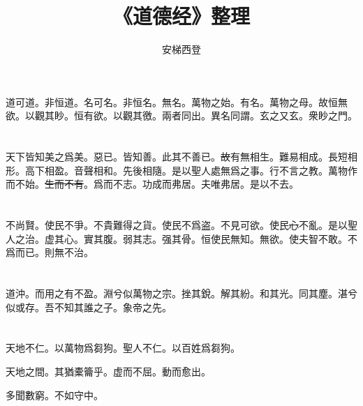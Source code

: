 \documentclass[a5paper]{ctexbook}
\title{《道德经》整理}
\author{安梯西登}
\date{}
\newcommand{\he}[1]{\textcolor[RGB]{255,0,255}{#1}}
\newcommand{\bo}[1]{\textcolor[RGB]{0,255,255}{#1}}
\newcommand{\jian}[1]{\textcolor[RGB]{0,255,0}{#1}}
\def\del{\sout}
\begin{document}
    \maketitle

    \tableofcontents

    \chapter{}

    道可道。非\bo{恒}道。名可名。非\bo{恒}名。無名。\bo{萬物}之始。有名。萬物之母。故\bo{恒}無欲。以觀其\bo{眇}。\bo{恒}有欲。以觀其徼。\bo{兩者同出。異名同謂}。玄之又玄。衆\bo{眇}之門。

    \chapter{}

    天下皆知美之爲美。\jian{惡已}。\jian{皆知善。此其不善已}。\jian{\del{故}}有無相生。難易相成。長短相\he{形}。高下相\bo{盈}。音聲相和。\jian{先}後相隨。是以聖人處無爲之事。行不言之教。萬物\jian{作而不始}。\jian{\del{生而不有}}。爲而不\jian{志}。功成而弗居。夫唯弗居。是以不去。

    \chapter{}

    不尚賢。使民不爭。不貴難得之貨。使民不爲盗。不見可欲。使民\bo{\del{心}}不亂。是以聖人之治。虚其心。實其腹。弱其志。强其骨。\bo{恒}使民無知。無欲。\bo{使夫智不敢。不爲而已}。則無不治。

    \chapter{}

    道沖。而用之\bo{有}不盈。淵兮似萬物之宗。挫其銳。解其紛。和其光。同其塵。湛兮似或存。吾不知\bo{其}誰之子。象帝之先。

    \chapter{}

    天地不仁。以萬物爲芻狗。聖人不仁。以百姓爲芻狗。

    天地之間。其猶橐籥乎。虚而不屈。動而愈出。

    多\bo{聞}數窮。不如守中。

    \chapter{}
\end{document}
